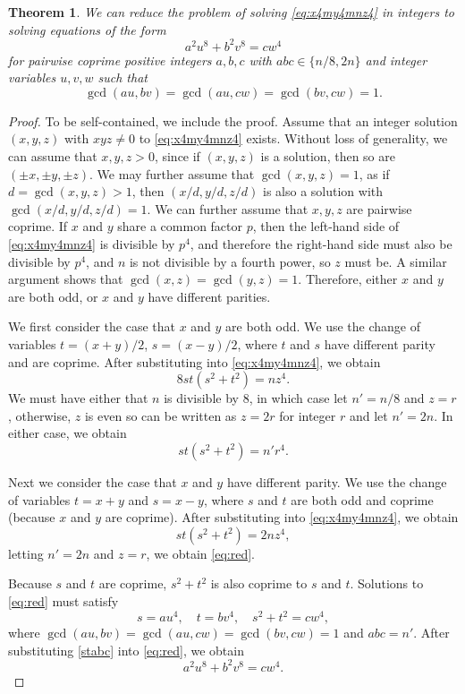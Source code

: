 \documentclass[a4paper,12pt,english,reqno]{amsart}
\newtheorem{theorem}{Theorem}
\begin{document}
\begin{theorem}\label{T2}\cite[Section 6.3.4]{mainbook} 
We can reduce the problem of solving \eqref{eq:x4my4mnz4} in integers to solving equations of the form
\begin{equation}\label{eq:abcuvw}
a^2u^8+b^2v^8=c w^4
\end{equation}
for pairwise coprime positive integers $a,b,c$ with $abc\in\{n/8,2n\}$ and integer variables $u,v,w$ such that
\begin{equation}\label{eq:cond}
\gcd(au,bv)= \gcd(au,cw)= \gcd(bv,cw)= 1.
\end{equation}
\end{theorem}


\begin{proof} 
To be self-contained, we include the proof. Assume that an integer solution $(x,y,z)$ with $xyz \neq 0$ to \eqref{eq:x4my4mnz4} exists. Without loss of generality, we can assume that $x,y,z >0$, since if $(x,y,z)$ is a solution, then so are $(\pm x,\pm y, \pm z)$. We may further assume that $\gcd(x,y,z)=1$, as if $d=\gcd(x,y,z)>1$, then $(x/d,y/d,z/d)$ is also a solution with $\gcd(x/d,y/d,z/d)=1$.  We can further assume that $x,y,z$ are pairwise coprime. If $x$ and $y$ share a common factor $p$, then the left-hand side of \eqref{eq:x4my4mnz4} is divisible by $p^4$, and therefore the right-hand side must also be divisible by $p^4$, and $n$ is not divisible by a fourth power, so $z$ must be. A similar argument shows that $\gcd(x,z)=\gcd(y,z)=1$. 
Therefore, either $x$ and $y$ are both odd, or $x$ and $y$ have different parities. 

We first consider the case that $x$ and $y$ are both odd. We use the change of variables $t=(x+y)/2$, $s=(x-y)/2$, where $t$ and $s$ have different parity and are coprime. After substituting into \eqref{eq:x4my4mnz4}, we obtain
$$
8st(s^2+t^2)=nz^4.
$$
We must have either that $n$ is divisible by $8$, in which case let $n'=n/8$ and $z=r$, otherwise, $z$ is even so can be written as $z=2r$ for integer $r$ and let $n'=2n$. In either case, we obtain 
\begin{equation}\label{eq:red}
st(s^2+t^2)=n'r^4.
\end{equation}

Next we consider the case that $x$ and $y$ have different parity. We use the change of variables $t=x+y$ and $s=x-y$, where $s$ and $t$ are both odd and coprime (because $x$ and $y$ are coprime). After substituting into \eqref{eq:x4my4mnz4}, we obtain
$$
st(s^2+t^2)=2nz^4,
$$
letting $n'=2n$ and $z=r$, we obtain \eqref{eq:red}.

Because $s$ and $t$ are coprime, $s^2+t^2$ is also coprime to $s$ and $t$. Solutions to \eqref{eq:red} must satisfy
\begin{equation}\label{stabc}
s=au^4, \quad t=bv^4, \quad s^2+t^2=c w^4,
\end{equation}
where $\gcd(au,bv)=\gcd(au,cw)=\gcd(bv,cw)=1$ and $abc=n'$.
After substituting \eqref{stabc} into \eqref{eq:red}, we obtain 
$$
a^2u^8+b^2v^8=c w^4.
$$
\end{proof}
\end{document}
